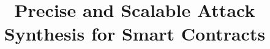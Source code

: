 \documentclass[pageno]{jpaper}
\begin{document}
\title{Precise and Scalable Attack Synthesis for Smart Contracts}

\date{}
\maketitle

\thispagestyle{empty}

















% 
% 
% 
\end{document}
